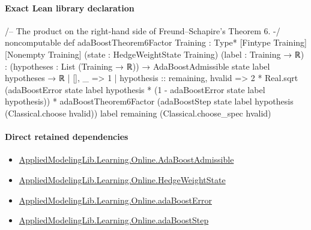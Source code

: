 \documentclass[10pt]{article}
\begin{document}
\paragraph{Exact Lean library declaration}
\begin{ReviewVerbatim}
/-- The product on the right-hand side of Freund--Schapire's Theorem 6. -/
noncomputable def adaBoostTheorem6Factor
    {Training : Type*} [Fintype Training] [Nonempty Training]
    (state : HedgeWeightState Training) (label : Training → ℝ) :
    (hypotheses : List (Training → ℝ)) →
      AdaBoostAdmissible state label hypotheses → ℝ
  | [], _ => 1
  | hypothesis :: remaining, hvalid =>
      2 * Real.sqrt
          (adaBoostError state label hypothesis *
            (1 - adaBoostError state label hypothesis)) *
        adaBoostTheorem6Factor
          (adaBoostStep state label hypothesis (Classical.choose hvalid)) label remaining
          (Classical.choose_spec hvalid)
\end{ReviewVerbatim}

\paragraph{Direct retained dependencies}
\begin{itemize}\raggedright
\item \hyperlink{library-prerequisite-2771987b29f636cf}{Applied\allowbreak{}Modeling\allowbreak{}Lib.\allowbreak{}Learning.\allowbreak{}Online.\allowbreak{}Ada\allowbreak{}Boost\allowbreak{}Admissible}
\item \hyperlink{library-prerequisite-8196082d02788389}{Applied\allowbreak{}Modeling\allowbreak{}Lib.\allowbreak{}Learning.\allowbreak{}Online.\allowbreak{}Hedge\allowbreak{}Weight\allowbreak{}State}
\item \hyperlink{governing-declaration-bd631eacbec4687c}{Applied\allowbreak{}Modeling\allowbreak{}Lib.\allowbreak{}Learning.\allowbreak{}Online.\allowbreak{}ada\allowbreak{}Boost\allowbreak{}Error}
\item \hyperlink{governing-declaration-ab9e0307acbbe7ff}{Applied\allowbreak{}Modeling\allowbreak{}Lib.\allowbreak{}Learning.\allowbreak{}Online.\allowbreak{}ada\allowbreak{}Boost\allowbreak{}Step}
\end{itemize}
\end{document}
